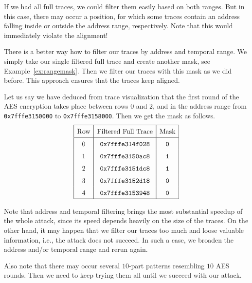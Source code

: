 		If we had all full traces, we could filter them easily based on both ranges. But in this case, there may occur a position, for which some traces contain an address falling inside or outside the address range, respectively. Note that this would immediately violate the alignment!
		
		\newpage   %
		
		\begin{remark}
		\label{rem:rangemask}
			There is a better way how to filter our traces by address and temporal range. We simply take our single filtered full trace and create another mask, see Example~\ref{ex:rangemask}. Then we filter our traces with this mask as we did before. This approach ensures that the traces keep aligned.
		\end{remark}
		
		\begin{example}
		\label{ex:rangemask}
			Let us say we have deduced from trace visualization that the first round of the AES encryption takes place between rows $0$ and $2$, and in the address range from {\tt 0x7fffe3150000} to {\tt 0x7fffe3158000}. Then we get the mask as follows.
			\[
			\arraycolsep=.5em\def\arraystretch{1.5}
				\begin{array}{|c|c|c|}
					\hline
					\textnormal{Row} & \textnormal{Filtered Full Trace} & \textnormal{Mask} \\
					\hline
					0 & {\tt 0x7fffe314f028} & {\tt 0} \\
					1 & {\tt 0x7fffe3150ac8} & {\tt 1} \\
					2 & {\tt 0x7fffe3151dc8} & {\tt 1} \\
					3 & {\tt 0x7fffe3152d18} & {\tt 0} \\
					4 & {\tt 0x7fffe3153948} & {\tt 0} \\
					\hline
				\end{array}
			\]
		\end{example}
		
		Note that address and temporal filtering brings the most substantial speedup of the whole attack, since its speed depends heavily on the size of the traces. On the other hand, it may happen that we filter our traces too much and loose valuable information, i.e., the attack does not succeed. In such a case, we broaden the address and/or temporal range and rerun again.
		
		Also note that there may occur several $10$-part patterns resembling $10$ AES rounds. Then we need to keep trying them all until we succeed with our attack.
		

